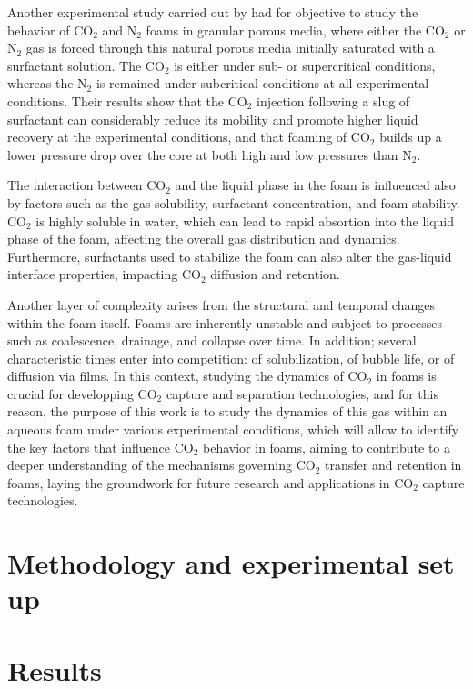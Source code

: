 \documentclass{article}
\begin{document}
Another experimental study carried out by \cite{farajzadeh2009comparative} had for objective to study the behavior of CO$_2$ and N$_2$ foams in granular porous media, where either the CO$_2$ or N$_2$ gas is forced through this natural porous media initially saturated with a surfactant solution. The CO$_2$ is either under sub- or supercritical conditions, whereas the N$_2$ is remained under subcritical conditions at all experimental conditions. Their results show that the CO$_2$ injection following a slug of surfactant can considerably reduce its mobility and promote higher liquid recovery at the experimental conditions, and that foaming of CO$_2$ builds up a lower pressure drop over the core at both high and low pressures than N$_2$.

The interaction between CO$_2$ and the liquid phase in the foam is influenced also by factors such as the gas solubility, surfactant concentration, and foam stability. CO$_2$ is highly soluble in water, which can lead to rapid absortion into the liquid phase of the foam, affecting the overall gas distribution and dynamics. Furthermore, surfactants used to stabilize the foam can also alter the gas-liquid interface properties, impacting CO$_2$ diffusion and retention. 

Another layer of complexity arises from the structural and temporal changes within the foam itself. Foams are inherently unstable and subject to processes such as coalescence, drainage, and collapse over time. In addition; several characteristic times enter into competition: of solubilization, of bubble life, or of diffusion via films. In this context, studying the dynamics of CO$_2$ in foams is crucial for developping CO$_2$ capture and separation technologies, and for this reason, the purpose of this work is to study the dynamics of this gas within an aqueous foam under various experimental conditions, which will allow to identify the key factors that influence CO$_2$ behavior in foams, aiming to contribute to a deeper understanding of the mechanisms governing CO$_2$ transfer and retention in foams, laying the groundwork for future research and applications in CO$_2$ capture technologies.  

\section{Methodology and experimental set up}


\section{Results}
\label{glacier_dynamics}
\end{document}
